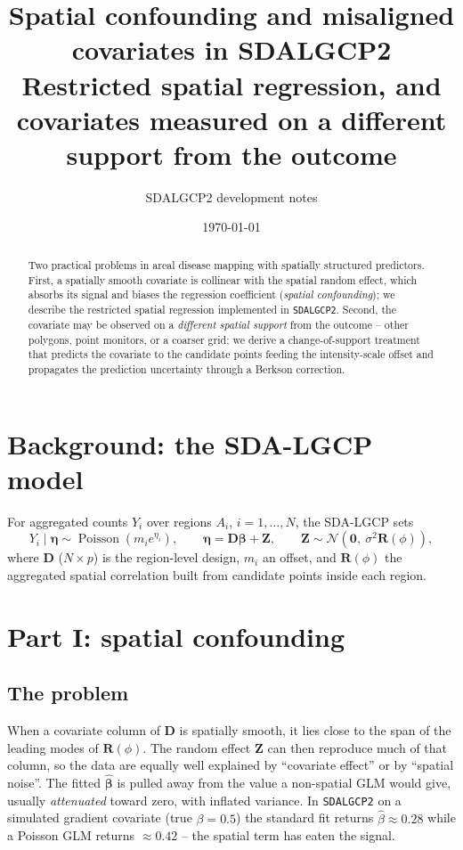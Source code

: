 \documentclass[11pt]{article}
\title{\textbf{Spatial confounding and misaligned covariates in SDALGCP2}\\[4pt]
\large Restricted spatial regression, and covariates measured on a different
support from the outcome}
\author{SDALGCP2 development notes}
\date{\today}
\newcommand{\R}{\mathbf{R}}
\newcommand{\D}{\mathbf{D}}
\newcommand{\bet}{{\bm{\beta}}}
\newcommand{\Ai}{A_i}
\newcommand{\N}{\mathcal{N}}
\begin{document}
\maketitle

\begin{abstract}
Two practical problems in areal disease mapping with spatially structured
predictors. First, a spatially smooth covariate is collinear with the spatial
random effect, which absorbs its signal and biases the regression coefficient
(\emph{spatial confounding}); we describe the restricted spatial regression
implemented in \texttt{SDALGCP2}. Second, the covariate may be observed on a
\emph{different spatial support} from the outcome -- other polygons, point
monitors, or a coarser grid; we derive a change-of-support treatment that predicts
the covariate to the candidate points feeding the intensity-scale offset and
propagates the prediction uncertainty through a Berkson correction.
\end{abstract}

\section{Background: the SDA-LGCP model}

For aggregated counts $Y_i$ over regions $\Ai$, $i=1,\dots,N$, the SDA-LGCP sets
\begin{equation}
Y_i \mid \bm\eta \sim \operatorname{Poisson}(m_i e^{\eta_i}),
\qquad \bm\eta = \D\bet + \mathbf{Z},
\qquad \mathbf{Z}\sim\N(\mathbf 0,\ \sigma^2\R(\phi)),
\label{eq:model}
\end{equation}
where $\D$ ($N\times p$) is the region-level design, $m_i$ an offset, and
$\R(\phi)$ the aggregated spatial correlation built from candidate points inside
each region.

\section{Part I: spatial confounding}

\subsection{The problem}
When a covariate column of $\D$ is spatially smooth, it lies close to the span of
the leading modes of $\R(\phi)$. The random effect $\mathbf Z$ can then reproduce
much of that column, so the data are equally well explained by ``covariate effect''
or by ``spatial noise''. The fitted $\widehat\bet$ is pulled away from the value a
non-spatial GLM would give, usually \emph{attenuated} toward zero, with inflated
variance. In \texttt{SDALGCP2} on a simulated gradient covariate (true
$\beta=0.5$) the standard fit returns $\widehat\beta\approx0.28$ while a Poisson GLM
returns $\approx0.42$ -- the spatial term has eaten the signal.
\end{document}

